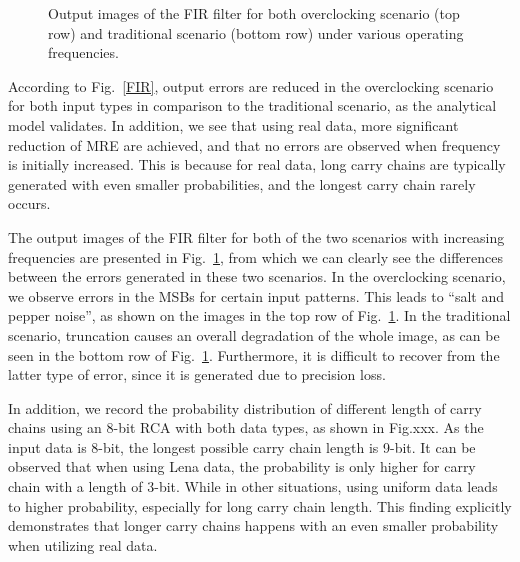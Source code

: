 \documentclass[journal]{IEEEtran}
\begin{document}
\begin{figure}[htbp]
{\begin{minipage}[c]{0.24\textwidth}
  \end{minipage}
  }
\caption{Output images of the FIR filter for both overclocking scenario (top row) and traditional scenario (bottom row) under various operating frequencies.}
\label{FIR_Lena}
\end{figure}

According to Fig.~\ref{FIR}, output errors are reduced in the overclocking scenario for both input types in comparison to the traditional scenario, as the analytical model validates. In addition, we see that using real data, more significant reduction of MRE are achieved, and that no errors are observed when frequency is initially increased. This is because for real data, long carry chains are typically generated with even smaller probabilities, and the longest carry chain rarely occurs.

The output images of the FIR filter for both of the two scenarios with increasing frequencies are presented in Fig.~\ref{FIR_Lena}, from which we can clearly see the differences between the errors generated in these two scenarios. In the overclocking scenario, we observe errors in the MSBs for certain input patterns. This leads to ``salt and pepper noise'', as shown on the images in the top row of Fig.~\ref{FIR_Lena}. In the traditional scenario, truncation causes an overall degradation of the whole image, as can be seen in the bottom row of Fig.~\ref{FIR_Lena}. Furthermore, it is difficult to recover from the latter type of error, since it is generated due to precision loss.

In addition, we record the probability distribution of different length of carry chains using an 8-bit RCA with both data types, as shown in Fig.xxx. As the input data is 8-bit, the longest possible carry chain length is 9-bit. It can be observed that when using Lena data,  the probability is only higher for carry chain with a length of 3-bit. While in other situations, using uniform data leads to higher probability, especially for long carry chain length. This finding explicitly demonstrates that longer carry chains happens with an even smaller probability when utilizing real data.


\end{document}
